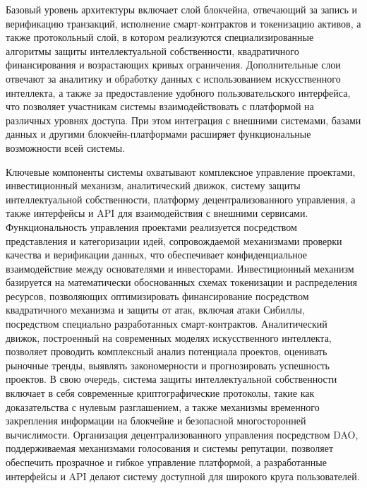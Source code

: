 \documentclass[
    candidate, %
    subf, %
    dotsinheaders=false,
]{disser}
\begin{document}
Базовый уровень архитектуры включает слой блокчейна, отвечающий за запись и верификацию транзакций, исполнение смарт-контрактов и токенизацию активов, а также протокольный слой, в котором реализуются специализированные алгоритмы защиты интеллектуальной собственности, квадратичного финансирования и возрастающих кривых ограничения. Дополнительные слои отвечают за аналитику и обработку данных с использованием искусственного интеллекта, а также за предоставление удобного пользовательского интерфейса, что позволяет участникам системы взаимодействовать с платформой на различных уровнях доступа. При этом интеграция с внешними системами, базами данных и другими блокчейн-платформами расширяет функциональные возможности всей системы.

Ключевые компоненты системы охватывают комплексное управление проектами, инвестиционный механизм, аналитический движок, систему защиты интеллектуальной собственности, платформу децентрализованного управления, а также интерфейсы и API для взаимодействия с внешними сервисами. Функциональность управления проектами реализуется посредством представления и категоризации идей, сопровождаемой механизмами проверки качества и верификации данных, что обеспечивает конфиденциальное взаимодействие между основателями и инвесторами. Инвестиционный механизм базируется на математически обоснованных схемах токенизации и распределения ресурсов, позволяющих оптимизировать финансирование посредством квадратичного механизма и защиты от атак, включая атаки Сибиллы, посредством специально разработанных смарт-контрактов. Аналитический движок, построенный на современных моделях искусственного интеллекта, позволяет проводить комплексный анализ потенциала проектов, оценивать рыночные тренды, выявлять закономерности и прогнозировать успешность проектов. В свою очередь, система защиты интеллектуальной собственности включает в себя современные криптографические протоколы, такие как доказательства с нулевым разглашением, а также механизмы временного закрепления информации на блокчейне и безопасной многосторонней вычислимости. Организация децентрализованного управления посредством DAO, поддерживаемая механизмами голосования и системы репутации, позволяет обеспечить прозрачное и гибкое управление платформой, а разработанные интерфейсы и API делают систему доступной для широкого круга пользователей.
\end{document}
